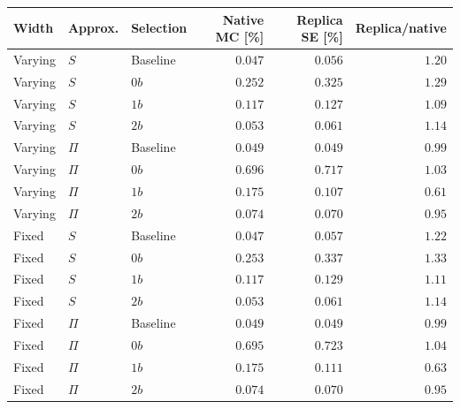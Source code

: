 \begin{tabular}{lllrrr}
\toprule
Width & Approx. & Selection & Native MC [\%] & Replica SE [\%] & Replica/native \\
\midrule
Varying & $S$ & Baseline & $0.047$ & $0.056$ & $1.20$ \\
Varying & $S$ & $0b$ & $0.252$ & $0.325$ & $1.29$ \\
Varying & $S$ & $1b$ & $0.117$ & $0.127$ & $1.09$ \\
Varying & $S$ & $2b$ & $0.053$ & $0.061$ & $1.14$ \\
Varying & $\Pi$ & Baseline & $0.049$ & $0.049$ & $0.99$ \\
Varying & $\Pi$ & $0b$ & $0.696$ & $0.717$ & $1.03$ \\
Varying & $\Pi$ & $1b$ & $0.175$ & $0.107$ & $0.61$ \\
Varying & $\Pi$ & $2b$ & $0.074$ & $0.070$ & $0.95$ \\
Fixed & $S$ & Baseline & $0.047$ & $0.057$ & $1.22$ \\
Fixed & $S$ & $0b$ & $0.253$ & $0.337$ & $1.33$ \\
Fixed & $S$ & $1b$ & $0.117$ & $0.129$ & $1.11$ \\
Fixed & $S$ & $2b$ & $0.053$ & $0.061$ & $1.14$ \\
Fixed & $\Pi$ & Baseline & $0.049$ & $0.049$ & $0.99$ \\
Fixed & $\Pi$ & $0b$ & $0.695$ & $0.723$ & $1.04$ \\
Fixed & $\Pi$ & $1b$ & $0.175$ & $0.111$ & $0.63$ \\
Fixed & $\Pi$ & $2b$ & $0.074$ & $0.070$ & $0.95$ \\
\bottomrule
\end{tabular}
